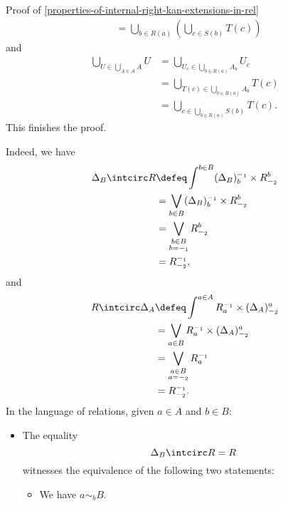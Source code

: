 \begin{Proof}{Proof of \cref{properties-of-internal-right-kan-extensions-in-rel}}
\begin{align*}
                                                     &= \bigcup_{b\in R(a)}(\bigcup_{c\in S(b)}T(c))
    \end{align*}
    and
    \begin{align*}
        \bigcup_{U\in\bigcup_{A\in\mathcal{A}}A}U &= \bigcup_{U_{c}\in\bigcup_{b\in R(a)}A_{b}}U_{c}\\%
                                                  &= \bigcup_{T(c)\in\bigcup_{b\in R(a)}A_{b}}T(c)\\%
                                                  &= \bigcup_{c\in\bigcup_{b\in R(a)}S(b)}T(c).%
    \end{align*}
    This finishes the proof.

    Indeed, we have
    \begin{align*}
        \Delta_{B}\intcirc R &\defeq \int^{b\in B}(\Delta_{B})^{-_{1}}_{b}\times R^{b}_{-_{2}}\\
                             &=      \bigvee_{b\in B}(\Delta_{B})^{-_{1}}_{b}\times R^{b}_{-_{2}}\\
                             &=      \bigvee_{\substack{b\in B\\b=-_{1}}}R^{b}_{-_{2}}\\
                             &=      R^{-_{1}}_{-_{2}},
    \end{align*}
    and
    \begin{align*}
        R\intcirc\Delta_{A} &\defeq \int^{a\in A}R^{-_{1}}_{a}\times(\Delta_{A})^{a}_{-_{2}}\\
                            &=      \bigvee_{a\in B}R^{-_{1}}_{a}\times(\Delta_{A})^{a}_{-_{2}}\\
                            &=      \bigvee_{\substack{a\in B\\a=-_{2}}}R^{-_{1}}_{a}\\
                            &=      R^{-_{1}}_{-_{2}}.
    \end{align*}
    In the language of relations, given $a\in A$ and $b\in B$:
    \begin{itemize}
        \item The equality
            \[
                \Delta_{B}\intcirc R%
                =%
                R%
            \]%
            witnesses the equivalence of the following two statements:
            \begin{itemize}
                \item We have $a\sim_{b}B$.

\end{itemize}
\end{itemize}
\end{Proof}
